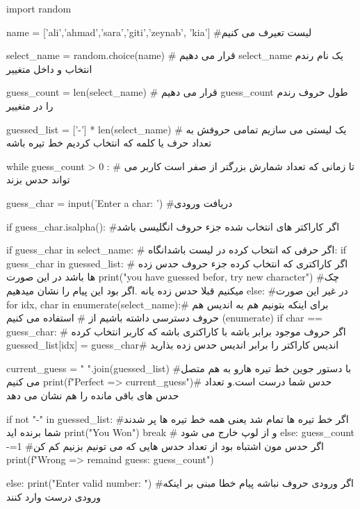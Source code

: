 import random

name = ['ali','ahmad','sara','giti','zeynab', 'kia'] #لیست تعیرف می کنیم


select_name = random.choice(name) # قرار می دهیم select_name یک نام رندم انتخاب و داخل متغییر 

guess_count = len(select_name) #   قرار می دهیم guess_count  طول حروف رندم را در متغییر 

guessed_list = ['-'] * len(select_name) # یک لیستی می سازیم تمامی حروفش  به تعداد حرف یا کلمه که انتخاب کردیم خط تیره باشه

while guess_count > 0 : # تا زمانی که تعداد شمارش بزرگتر از صفر است کاربر می تواند حدس بزند

    guess_char = input('Enter a char: ') #دریافت ورودی
    
    if guess_char.isalpha(): #اگر کاراکتر های انتخاب شده جزء حروف انگلیسی باشد 

        if guess_char in select_name: # اگر حرفی که انتخاب کرده در لیست باشدانگاه:
            if guess_char in  guessed_list: # اگر کاراکتری که انتخاب کرده جزء حروف حدس زده ها باشد در این صورت
                print("you have guessed befor, try new character") #چک میکنیم قبلا حدس زده یانه .اگر بود این پیام را نشان میدهیم
            else: #در غیر این صورت 
              for idx, char in enumerate(select_name):# برای اینکه بتونیم هم به اندیس هم حروف دسترسی داشته باشیم از 
                                                        # استفاده می کنیم (enumerate)
                if char == guess_char: # اگر حروف موجود برابر باشه با کاراکتری باشه که کاربر انتخاب کرده
                    guessed_list[idx] = guess_char# اندیس کاراکتر را برابر اندیس حدس زده بذارید

            current_guess = " ".join(guessed_list) #با دستور جوین خط تیره هارو به هم متصل می کنیم
            print(f"Perfect => {current_guess}")# حدس شما درست است.و تعداد حدس های باقی مانده را هم نشان می دهد

            if not "-" in guessed_list:  #اگر خط  تیره ها تمام شد یعنی همه خط تیره ها پر شدند شما برنده اید
                print("You Won")
                break  # و از لوپ خارج می شود
        else:   
              guess_count -=1 #اگر حدس مون اشتباه بود از تعداد حدس هایی که می تونیم بزنیم کم کن
              print(f"Wrong => remaind guess: {guess_count}")
     
    else:
        print("Enter valid number: ")      #اگر ورودی حروف نباشه پیام خطا مبنی بر اینکه  ورودی درست وارد کنند